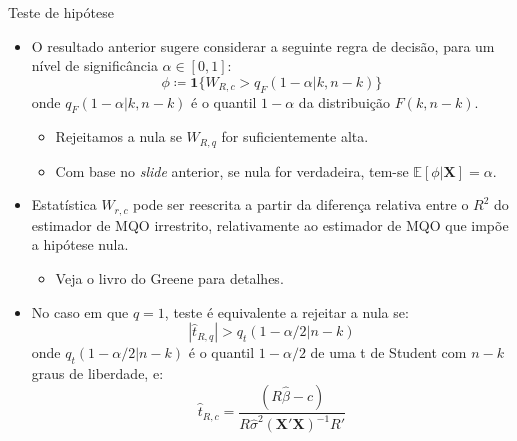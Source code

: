 \documentclass[11pt]{beamer}
\begin{document}
\begin{frame}{Teste de hipótese}
\begin{itemize}
	\item O resultado anterior sugere considerar a seguinte regra de decisão, para um nível de significância $\alpha \in [0,1]$:
	$$\phi \coloneqq \mathbf{1}\{W_{R,c}> q_F(1-\alpha|k,n-k)\}$$
	onde $q_F(1-\alpha|k,n-k)$ é o quantil $1-\alpha$ da distribuição $F(k,n-k)$.
	\begin{itemize}
		\item Rejeitamos a nula se $W_{R,q}$ for suficientemente alta.
		\item Com base no \textit{slide} anterior, se nula for verdadeira, tem-se $\mathbb{E}[\phi|\boldsymbol{X}] = \alpha$.
	\end{itemize}
	\item Estatística $W_{r,c}$ pode ser reescrita a partir da diferença relativa entre o $R^2$ do estimador de MQO irrestrito, relativamente ao estimador de MQO que impõe a hipótese nula.
	\begin{itemize}
		\item Veja o livro do Greene para detalhes.
	\end{itemize}
	\item No caso em que $q=1$, teste é equivalente a rejeitar a nula se:
	$$|\hat{t}_{R,q}| > q_t(1-\alpha/2|n-k)$$
	onde $q_t(1-\alpha/2|n-k)$ é o quantil $1-\alpha/2$ de uma t de Student com $n-k$ graus de liberdade, e:
	\vspace{-0.5em}
	$$\hat{t}_{R,c} = \frac{(R\hat{\beta}-c)}{R\hat{\sigma}^2(\boldsymbol{X}'\boldsymbol{X})^{-1}R'}$$
\end{itemize}
\end{frame}
\end{document}
